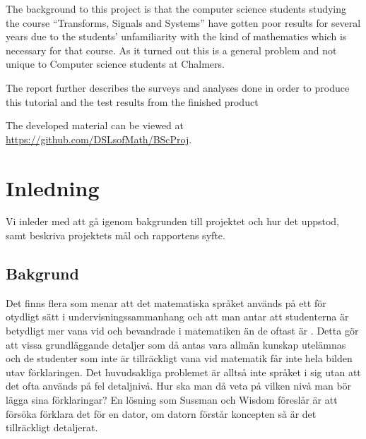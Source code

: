 \documentclass[]{article}
\begin{document}
The background to this project is that the computer science students studying
the course ``Transforms, Signals and Systems'' have gotten poor results for
several years due to the students' unfamiliarity with the kind of mathematics
which is necessary for that course. As it turned out this is a general problem
and not unique to Computer science students at Chalmers.

The report further describes the surveys and analyses done in order to produce
this tutorial and the test results from the finished product

The developed material can be viewed at \url{https://github.com/DSLsofMath/BScProj}.

\newpage


\newpage

\tableofcontents

\newpage

\printglossary[title=Ordlista,nonumberlist]

\newpage

\section{Inledning}
Vi inleder med att gå igenom bakgrunden till projektet och hur det
uppstod, samt beskriva projektets mål och rapportens syfte.

\subsection{Bakgrund}
%

Det finns flera som menar att det matematiska språket används på ett för
otydligt sätt i undervisningssammanhang och att man antar att studenterna
är betydligt mer vana vid och bevandrade i matematiken än de oftast är
\cite{sussman2002role} \cite{wells1995communicating}.
Detta gör att vissa grundläggande detaljer som då antas vara allmän kunskap
utelämnas och de studenter som inte är tillräckligt vana vid matematik får inte
hela bilden utav förklaringen.
Det huvudsakliga problemet är alltså inte språket i sig utan att det ofta
används på fel detaljnivå. Hur ska man då veta på vilken nivå man bör lägga
sina förklaringar? En lösning som Sussman och Wisdom föreslår är att
försöka förklara det för en dator, om datorn förstår koncepten så är det
tillräckligt detaljerat.
\end{document}
